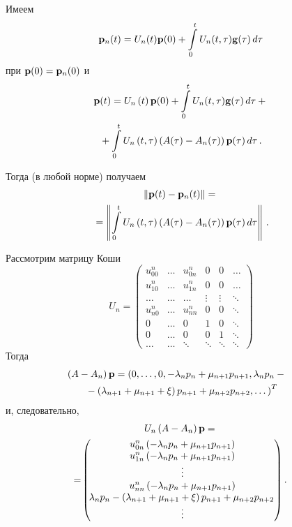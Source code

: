 \begin{multicols}{2}

Имеем
\begin{equation*}
{\bf p}_n (t)= U_n(t){\bf p} (0) + \int\limits_0^t U_n(t,\tau){\bf
g}(\tau)\, d\tau 
\end{equation*}
при ${\bf p} (0) = {\bf p}_n (0)$ и
\begin{multline*}
{\bf p} (t)= U_n \left(t\right) {\bf p} (0) + \int\limits_0^t
U_n(t,\tau){\bf g}(\tau)\, d\tau + {}\\
{}+
\int\limits_0^t U_n \left(t,
\tau\right) \left(A(\tau) - A_n(\tau) \right) {\bf p} (\tau)\,
d\tau\,. 
\end{multline*}

Тогда (в любой норме) получаем
\begin{multline}
\left\|{\bf p} (t) - {\bf p}_n (t)\right\| = {}\\
{}= 
\left\|\int\limits_0^t U_n \left(t,
 \tau\right) \left(A(\tau) -
 A_n(\tau) \right) {\bf p} (\tau)\, d\tau \right\|\,.
\label{cat063}
\end{multline}

Рассмотрим матрицу Коши
\begin{equation*}
U_n =
\begin{pmatrix}
  u_{00}^n & \ldots & u_{0n}^n  & 0 & 0 & \ldots \\
u_{10}^n & \ldots & u_{1n}^n  & 0 & 0 & \ldots \\
\ldots & \ldots& \ldots & \vdots & \vdots & \ddots \\
u_{n0}^n & \ldots & u_{nn}^n  & 0 & 0 & \ddots \\
0 & \ldots & 0 & 1 & 0 & \ddots \\
0 & \ldots & 0 & 0 & 1 & \ddots \\
\ldots & \ldots& \ddots & \ddots & \ddots &\ddots
\end{pmatrix}
\end{equation*}
Тогда
\begin{multline*}
\!\!\!\!\left(A -A_n\right) {\bf p} = \left(0,\dots,0,-\lambda_np_n +
\mu_{n+1}p_{n+1}, \lambda_np_n -{}\right.\\
\left.{}- \left(\lambda_{n+1} + \mu_{n+1}+\xi
\right)p_{n+1} + \mu_{n+2}p_{n+2},\dots \right)^T 
\end{multline*}
и, следовательно,
\begin{multline*}
U_n\left(A -A_n\right) {\bf p} ={}\\
\!=\!
\begin{pmatrix}
u_{0n}^n\left(-\lambda_np_n +
\mu_{n+1}p_{n+1}\right)\\
u_{1n}^n\left(-\lambda_np_n +
\mu_{n+1}p_{n+1}\right) \\ \vdots \\
u_{nn}^n\left(-\lambda_np_n +
 \mu_{n+1}p_{n+1}\right) \\ \!\lambda_np_n -\left(\lambda_{n+1} +
\mu_{n+1}+\xi\right)p_{n+1} + \mu_{n+2}p_{n+2} \\ \vdots
\end{pmatrix}.
\end{multline*}


\end{multicols}
